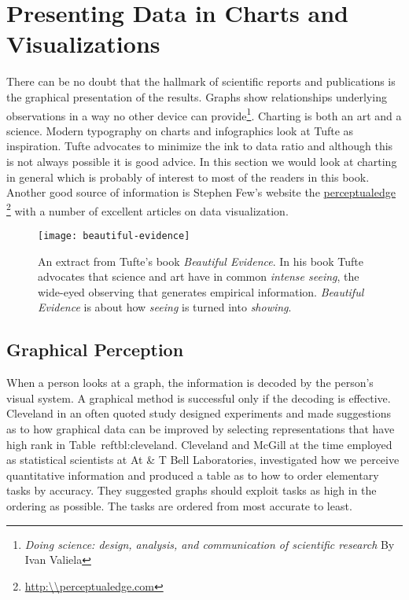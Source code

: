\let\luacmd\textbf
\chapter{Presenting Data in Charts and Visualizations}
\label{ch:charts}
\pagestyle{headings}

There can be no doubt that the hallmark of scientific reports and publications is the graphical presentation of the results. Graphs show relationships underlying observations in a way no other device can provide\footnote{\textit{Doing science: design, analysis, and communication of scientific research}
 By Ivan Valiela}.  Charting is both an art and a science. Modern typography on charts and infographics look at Tufte as inspiration.
Tufte advocates to minimize the ink to data ratio and although this is not always possible it is good advice.
In this section we would look at charting in general which is probably of interest to most of the readers
in this book.  Another good source of information is Stephen Few’s website the \href{perpetualedge}{perceptualedge} \footnote{\protect\url{http:\\perceptualedge.com}}  with a number of excellent articles on data visualization. 

\begin{figure}[htbp]
\texttt{[image: beautiful-evidence]}
\caption{An extract from Tufte’s book \textit{Beautiful Evidence}. In his book Tufte advocates that science and art have in common \emph{intense seeing}, the wide-eyed observing that generates empirical information. \textit{Beautiful Evidence} is about how \emph{seeing} is turned into \emph{showing}. \cite{Tufte2006}}
\end{figure}

\section{Graphical Perception}

When a person looks at a graph, the information is decoded by the person’s visual system. A graphical method is successful only if the decoding is effective. Cleveland \citeyearpar{cleveland1985} in an often quoted study designed experiments and made suggestions as to how graphical data can be improved by selecting representations that have high rank in Table~ref{tbl:cleveland}. Cleveland and McGill at the time employed as statistical scientists at At \& T Bell Laboratories, investigated how we perceive quantitative information and produced a table as to how to order elementary tasks by accuracy. They suggested graphs should exploit tasks as high in the ordering as possible. The tasks are ordered from most accurate to least.

